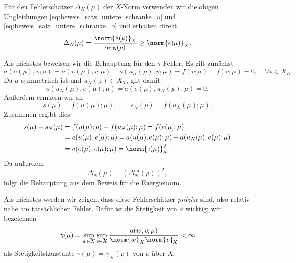 \begin{Satz}
\begin{Beweis}
        Für den Fehlerschätzer $\Delta_N(\mu)$ der $X$-Norm verwenden wir die obigen Ungleichungen \eqref{eq:beweis_satz_untere_schranke_a} und \eqref{eq:beweis_satz_untere_schranke_b} und erhalten direkt
        \begin{equation}
            \Delta_N(\mu) = \frac{\norm{\hat e(\mu)}_X}{\alpha_\text{LB}(\mu)} \geq \norm{e(\mu)}_X.
        \end{equation}

        Als nächstes beweisen wir die Behauptung für den $s$-Fehler. Es gilt zunächst
        \begin{equation}
            a(e(\mu), v; \mu) = a(u(\mu), v; \mu) - a(u_N(\mu), v; \mu) = f(v; \mu) - f(v; \mu) = 0, \quad \forall v \in X_N.
        \end{equation}
        Da $a$ symmetrisch ist und $u_N(\mu) \in X_N$, gilt damit
        \begin{equation}
            a(u_N(\mu), e(\mu); \mu) = a(e(\mu), u_N(\mu); \mu) = 0.
        \end{equation}
        Außerdem erinnern wir an
        \begin{equation}
            s(\mu) = f(u(\mu); \mu), \qquad s_N(\mu) = f(u_N(\mu); \mu).
        \end{equation}
        Zusammen ergibt dies
        \begin{align}
            s(\mu) - s_N(\mu) &= f(u(\mu); \mu) - f(u_N(\mu); \mu) = f(e(\mu); \mu) \\
            &= a(u(\mu), e(\mu); \mu) = a(u(\mu), e(\mu); \mu) - a(u_N(\mu), e(\mu); \mu)\\
            &= a(e(\mu), e(\mu); \mu) = \norm{e(\mu)}_{\mu}^2.
        \end{align}
        Da außerdem
        \begin{equation}
            \Delta^s_N(\mu) = \left( \Delta^{\text{en}}_N(\mu) \right)^2,
        \end{equation}
        folgt die Behauptung aus dem Beweis für die Energienorm.
    \end{Beweis}
\end{Satz}

Als nächstes werden wir zeigen, dass diese Fehlerschätzer \emph{präzise} sind, also relativ nahe am tatsächlichen Fehler.
Dafür ist die Stetigkeit von $a$ wichtig; wir bezeichnen
\begin{equation}
    \gamma(\mu) = \sup_{w\in X} \sup_{v \in X} \frac{a(w, v; \mu)}{\norm{w}_X \norm{v}_X} < \infty
\end{equation}
als Stetigkeitskonstante $\gamma(\mu) = \gamma_{\mathcal N}(\mu)$ von $a$ über $X$.

